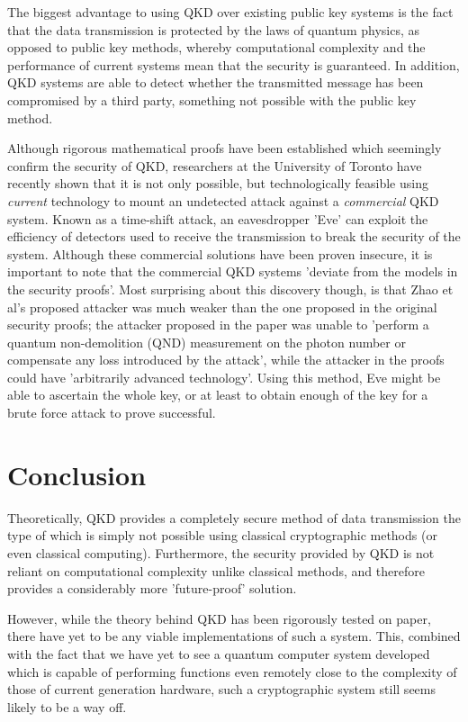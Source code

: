 \documentclass[runningheads,a4paper]{llncs}
\begin{document}
The biggest advantage to using QKD over existing public key systems is the fact that the data transmission is protected by the laws of quantum physics, as opposed to public key methods, whereby computational complexity and the performance of current systems mean that the security is guaranteed. In addition, QKD systems are able to detect whether the transmitted message has been compromised by a third party, something not possible with the public key method.

Although rigorous mathematical proofs have been established which seemingly confirm the security of QKD\cite{Deutsch:1996fk}\cite{Shor:2000uq}, researchers at the University of Toronto have recently shown that it is not only possible, but technologically feasible using \emph{current} technology to mount an undetected attack against a \emph{commercial} QKD system. Known as a time-shift attack, an eavesdropper 'Eve' can exploit the efficiency of detectors used to receive the transmission to break the security of the system\cite{Zhao:2008fk}. Although these commercial solutions have been proven insecure, it is important to note that the commercial QKD systems 'deviate from the models in the security proofs'\cite{Lydersen:2010qy}. Most surprising about this discovery though, is that Zhao et al's proposed attacker was much weaker than the one proposed in the original security proofs; the attacker proposed in the paper was unable to 'perform a quantum non-demolition (QND) measurement on the photon number or compensate any loss introduced by the attack', while the attacker in the proofs could have 'arbitrarily advanced technology'. Using this method, Eve might be able to ascertain the whole key, or at least to obtain enough of the key for a brute force attack to prove successful.

\section{Conclusion}

Theoretically, QKD provides a completely secure method of data transmission the type of which is simply not possible using classical cryptographic methods (or even classical computing). Furthermore, the security provided by QKD is not reliant on computational complexity unlike classical methods, and therefore provides a considerably more 'future-proof' solution. 

However, while the theory behind QKD has been rigorously tested on paper, there have yet to be any viable implementations of such a system. This, combined with the fact that we have yet to see a quantum computer system developed which is capable of performing functions even remotely close to the complexity of those of current generation hardware, such a cryptographic system still seems likely to be a way off.



\end{document}
